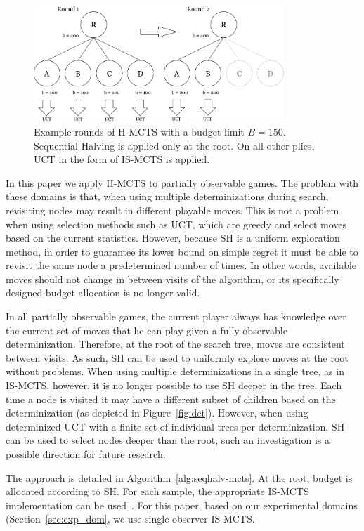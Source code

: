 \documentclass[a4paper]{llncs}
\begin{document}
\begin{figure}[ht]
	\centering
	\includegraphics[width=0.84\textwidth]{img/H-MCTS_Rounds.png}
	\caption[Hybrid MCTS example rounds]{Example rounds of H-MCTS with a budget limit $B = 150$. Sequential Halving is applied only at the root. On all other plies, UCT in the form of IS-MCTS is applied.}
	\label{fig:h-mcts_rounds}
\end{figure}

In this paper we apply H-MCTS to partially observable games. The problem with these domains is that, when using multiple determinizations during search, revisiting nodes may result in different playable moves. This is not a problem when using selection methods such as UCT, which are greedy and select moves based on the current statistics. However, because SH is a uniform exploration method, in order to guarantee its lower bound on simple regret it must be able to revisit the same node a predetermined number of times. In other words, available moves should not change in between visits of the algorithm, or its specifically designed budget allocation is no longer valid.

In all partially observable games, the current player always has knowledge over the current set of moves that he can play given a fully observable determinization. Therefore, at the root of the search tree, moves are consistent between visits. As such, SH can be used to uniformly explore moves at the root without problems. When using multiple determinizations in a single tree, as in IS-MCTS, however, it is no longer possible to use SH deeper in the tree. Each time a node is visited it may have a different subset of children based on the determinization (as depicted in Figure~\ref{fig:det}). However, when using determinized UCT with a finite set of individual trees per determinization, SH can be used to select nodes deeper than the root, such an investigation is a possible direction for future research.

The approach is detailed in Algorithm~\ref{alg:seqhalv-mcts}. At the root, budget is allocated according to SH. For each sample, the appropriate IS-MCTS implementation can be used~\cite{cowling2012}. For this paper, based on our experimental domains (Section~\ref{sec:exp_dom}, we use single observer IS-MCTS.
\end{document}
